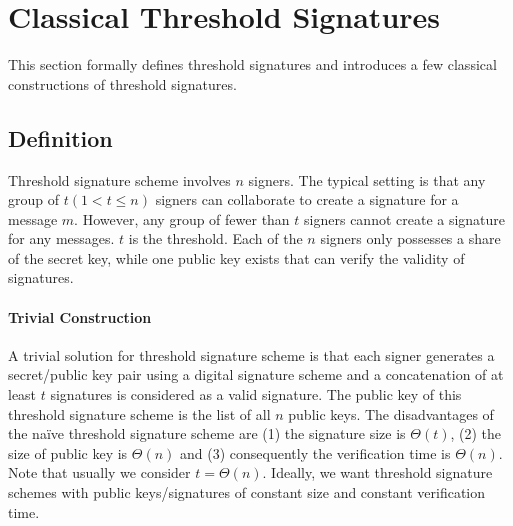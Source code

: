 \section{Classical Threshold Signatures} \label{sec:threshold}

This section formally defines threshold signatures and introduces a few classical constructions of threshold signatures. 
\subsection{Definition}
Threshold signature scheme involves $n$ signers. The typical setting is that any group of $t (1<t\le n)$ signers can collaborate to create a signature for a message $m$. However, any group of fewer than $t$ signers cannot create a signature for any messages. $t$ is the threshold. Each of the $n$ signers only possesses a share of the secret key, while one public key exists that can verify the validity of signatures. 

\paragraph{Trivial Construction} A trivial solution for threshold signature scheme is that each signer generates a secret/public key pair using a digital signature scheme and a concatenation of at least $t$ signatures is considered as a valid signature. The public key of this threshold signature scheme is the list of all $n$ public keys. The disadvantages of the na\"ive threshold signature scheme are (1) the signature size is $\Theta(t)$, (2) the size of public key is $\Theta(n)$ and (3) consequently the verification time is $\Theta(n)$. Note that usually we consider $t = \Theta(n)$. Ideally, we want threshold signature schemes with public keys/signatures of constant size and constant verification time. 

